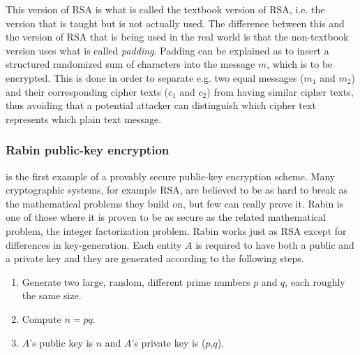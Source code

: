 \documentclass{acm_proc_article-sp}
\begin{document}
    This version of RSA is what is called the textbook version of RSA, i.e. the version that is taught but is not actually used. The difference between this and the version of RSA that is being used in the real world is that the non-textbook version uses what is called \emph{padding}. Padding can be explained as to insert a structured randomized sum of characters into the message $m$, which is to be encrypted. This is done in order to separate e.g. two equal messages ($m_1$ and $m_2$) and their corresponding cipher texts ($c_1$ and $c_2$) from having similar cipher texts, thus avoiding that a potential attacker can distinguish which cipher text represents which plain text message. 
    
    \subsubsection{Rabin public-key encryption}
     is the first example of a provably secure public-key encryption scheme. Many cryptographic systems, for example RSA, are believed to be as hard to break as the mathematical problems they build on, but few can really prove it. Rabin is one of those where it is proven to be as secure as the related mathematical problem, the integer factorization problem. Rabin works just as RSA except for differences in key-generation. Each entity $A$ is required to have both a public and a private key and they are generated according to the following steps.
    \begin{enumerate}
        \item Generate two large, random, different prime numbers $p$ and $q$, each roughly the same size.
        \item Compute $n = pq$.
        \item $A$'s public key is $n$ and $A$'s private key is ($p$,$q$).
    \end{enumerate}
    
\end{document}
